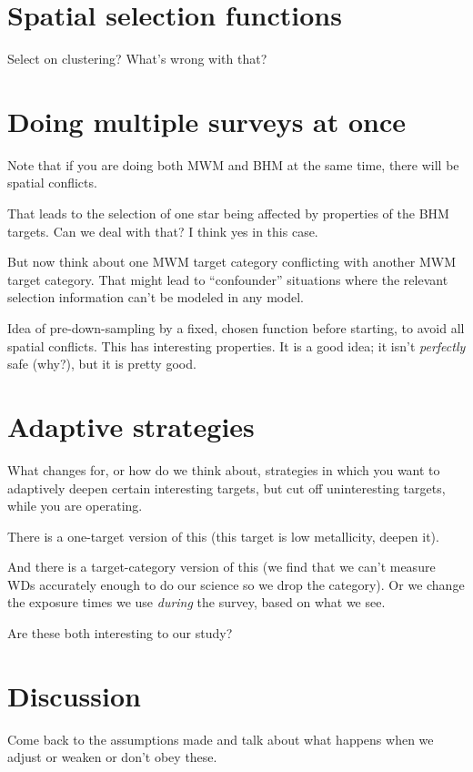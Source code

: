\documentclass[modern]{aastex62}
\begin{document}
\section{Spatial selection functions}

Select on clustering? What's wrong with that?

\section{Doing multiple surveys at once}

Note that if you are doing both MWM and BHM at the same time, there will be
spatial conflicts.

That leads to the selection of one star being affected by properties of the
BHM targets. Can we deal with that? I think yes in this case.

But now think about one MWM target category conflicting with another MWM target
category. That might lead to ``confounder'' situations where the relevant selection
information can't be modeled in any model.

Idea of pre-down-sampling by a fixed, chosen function before starting, to avoid
all spatial conflicts. This has interesting properties. It is a good idea; it isn't
\emph{perfectly} safe (why?), but it is pretty good.

\section{Adaptive strategies}

What changes for, or how do we think about, strategies in which you want to
adaptively deepen certain interesting targets, but cut off uninteresting targets,
while you are operating.

There is a one-target version of this (this target is low metallicity, deepen it).

And there is a target-category version of this (we find that we can't measure WDs
accurately enough to do our science so we drop the category). Or we change the exposure
times we use \emph{during} the survey, based on what we see.

Are these both interesting to our study?

\section{Discussion}

Come back to the assumptions made and talk about what happens when we
adjust or weaken or don't obey these.
\end{document}
